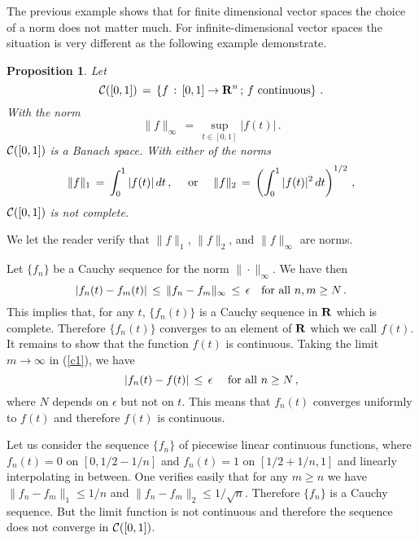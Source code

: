 \documentclass[12pt]{report}
\newcommand{\calC}{{\cal C}}
\newcommand{\bR}{{\bf R}}
\newtheorem{prop}[theorem]{Proposition}
\newcommand{\proof}{\noindent {\em Proof:~}}
\def\eqref#1{(\ref{#1})}
\def\qed{\hbox{\hskip 6pt\vrule width6pt height7pt depth1pt
    \hskip1pt}\bigskip}
\def\to{\rightarrow}
\begin{document}
The previous example shows that for finite dimensional vector spaces the choice of a norm does not matter much. 
For infinite-dimensional vector spaces the situation is very different as the following example demonstrate. 

\begin{prop}\label{cx} Let 
\begin{equation}
\calC ([0,1])\,=\, \left\{ f\,:\, [0,1] \to \bR^n \,;\, f {\rm
~continuous} \right\} \,.
\end{equation}
With the norm 
\begin{equation}
\|f\|_\infty \,=\, \sup_{t \in [0,1]} |f(t)| \,.
\end{equation}
$\calC ([0,1])$ is a Banach space.  With either of the norms 
\begin{equation} 
\|f\|_1 \,=\, \int _0^1 |f(t)|\,dt \,, \quad {\rm ~or~} \quad \|f\|_2
\,=\, \left(\int _0^1 |f(t)|^2 \,dt \right)^{1/2} \,,
\end{equation}
$\calC ([0,1])$ is not complete.
\end{prop}

\proof We let the reader verify that $\|f\|_1$, $\|f\|_2$, and
$\|f\|_\infty$ are norms.

Let $\{f_n\}$ be a Cauchy sequence for the norm $\| \cdot
\|_\infty$. We have then
\begin{equation}\label{c1}
|f_n(t) - f_m(t) | \, \le \, \|f_n - f_m \|_\infty \,\le \, \epsilon
 \quad {\rm for~all~} n,m \ge N\,.
\end{equation}
This implies that, for any $t$, $\{f_n(t)\}$ is a Cauchy sequence in
$\bR$ which is complete.  Therefore $\{f_n(t)\}$ converges to an
element of $\bR$ which we call $f(t)$. It remains to show that the
function $f(t)$ is continuous.  Taking the limit $m \to \infty$ in
\eqref{c1}, we have
\begin{equation}
|f_n(t) - f(t) | \,\le\, \epsilon  \quad {\rm ~for~all~} n \ge N \,,
\end{equation}
where $N$ depends on $\epsilon$ but not on $t$. This means that
$f_n(t)$ converges uniformly to $f(t)$ and therefore $f(t)$ is
continuous.

Let us consider the sequence $\{f_n\}$ of piecewise linear continuous
functions, where $f_n(t) =0$ on $[0, 1/2 - 1/n]$ and $f_n(t) =1$ on
$[1/2 + 1/n, 1]$ and linearly interpolating in between.  One verifies
easily that for any $m \ge n$ we have $\| f_n - f_m \|_1 \le 1/n$ and
$\| f_n - f_m \|_2 \le 1/\sqrt{n}$. Therefore $\{f_n\}$ is a Cauchy
sequence. But the limit function is not continuous and therefore the
sequence does not converge in $\calC ([0,1])$.  \hfill \qed
\end{document}
